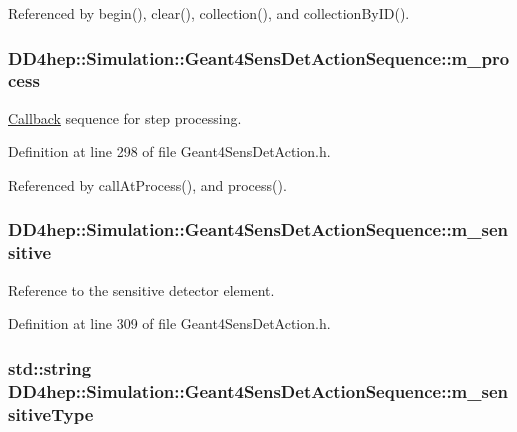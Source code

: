 Referenced by begin(), clear(), collection(), and collectionByID().\hypertarget{class_d_d4hep_1_1_simulation_1_1_geant4_sens_det_action_sequence_a2ebfed15148432bab44c58ce3c7a0a95}{
\subsubsection[{m\_\-process}]{ {\bf DD4hep::Simulation::Geant4SensDetActionSequence::m\_\-process}}}
\label{class_d_d4hep_1_1_simulation_1_1_geant4_sens_det_action_sequence_a2ebfed15148432bab44c58ce3c7a0a95}


\hyperlink{class_d_d4hep_1_1_callback}{Callback} sequence for step processing. 

Definition at line 298 of file Geant4SensDetAction.h.

Referenced by callAtProcess(), and process().\hypertarget{class_d_d4hep_1_1_simulation_1_1_geant4_sens_det_action_sequence_a480029ca979ac872688986da731930b8}{
\subsubsection[{m\_\-sensitive}]{ {\bf DD4hep::Simulation::Geant4SensDetActionSequence::m\_\-sensitive}}}
\label{class_d_d4hep_1_1_simulation_1_1_geant4_sens_det_action_sequence_a480029ca979ac872688986da731930b8}


Reference to the sensitive detector element. 

Definition at line 309 of file Geant4SensDetAction.h.\hypertarget{class_d_d4hep_1_1_simulation_1_1_geant4_sens_det_action_sequence_a51bf2c5186ea7905ae655b44d6aea06f}{
\subsubsection[{m\_\-sensitiveType}]{\setlength{\rightskip}{0pt plus 5cm}std::string {\bf DD4hep::Simulation::Geant4SensDetActionSequence::m\_\-sensitiveType}}}
\label{class_d_d4hep_1_1_simulation_1_1_geant4_sens_det_action_sequence_a51bf2c5186ea7905ae655b44d6aea06f}



